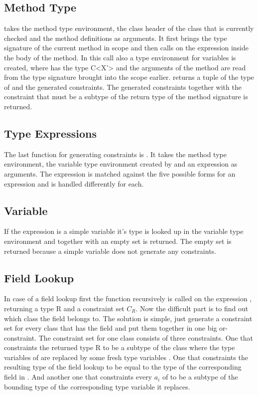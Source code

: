 \subsection{Method Type}

 takes the method type environment, the class header  of the class that is currently checked and the method definitions as arguments.
It first brings the type signature of the current method in scope and then calls  on the expression  inside the body of the method. In this call also a type environment for variables is created, where  has the type C<X'> and the arguments of the method are read from the type signature brought into the scope earlier.
 returns a tuple of the type  of  and the generated constraints. The generated constraints together with the constraint that  must be a subtype of the return type of the method signature is returned.

\subsection{Type Expressions}
The last function for generating constraints is . It takes the method type environment, the variable type environment created by  and an expression  as arguments.
The expression  is matched against the five possible forms for an expression and is handled differently for each.

\subsection{Variable}
If the expression is a simple variable it's type is looked up in the variable type environment and together with an empty set is returned. The empty set is returned because a simple variable does not generate any constraints.

\subsection{Field Lookup}
In case of a field lookup  first the  function recursively is called on the expression , returning a
type R and a constraint set $C_R$. Now the difficult part is to find out which class the field  belongs to. The solution is simple,
just generate a constraint set for every class  that has the field  and put them together in one big or-constraint.
The constraint set for one class consists of three constraints. One that constraints the returned type R to be a subtype
of the class  where the type variables of  are replaced by some fresh type variables . One that constraints the resulting type of the field lookup
to be equal to the type of the corresponding field in . And another one that constraints every $a_i$ of  to be a subtype of the bounding type of the corresponding type variable it replaces.

